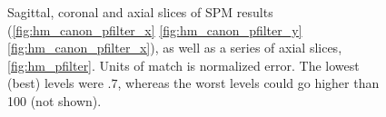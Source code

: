 \begin{figure}[H]
\caption{Sagittal, coronal and axial slices of SPM results (\autoref{fig:hm_canon_pfilter_x} \autoref{fig:hm_canon_pfilter_y} 
         \autoref{fig:hm_canon_pfilter_x}), as well as a series of axial slices, \autoref{fig:hm_pfilter}. 
         Units of match is normalized error. The lowest (best) levels were $.7$,
         whereas the worst levels could go higher than 100 (not shown).}
\label{fig:hm_canon_pfilter}
\end{figure}

